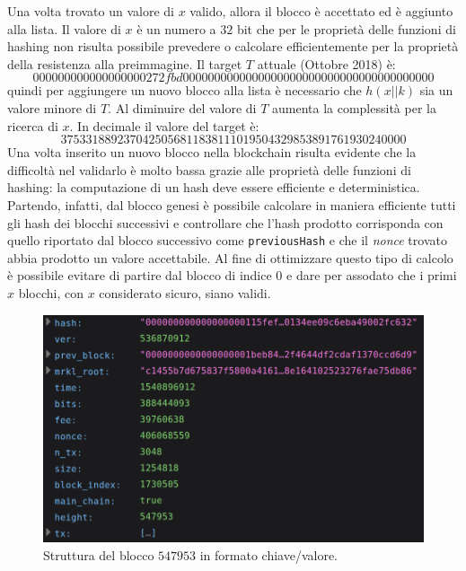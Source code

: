 Una volta trovato un valore di $x$ valido, allora il blocco è accettato ed è aggiunto alla lista. Il valore di $x$ è un numero a $32$ bit che per le proprietà delle funzioni di hashing non risulta possibile prevedere o calcolare efficientemente per la proprietà della resistenza alla preimmagine.\newline
Il target $T$ attuale (Ottobre 2018) è:
\begin{equation}
    000000000000000000272fbd0000000000000000000000000000000000000000
\end{equation}
quindi per aggiungere un nuovo blocco alla lista è necessario che $h(x||k)$ sia un valore minore di $T$. Al diminuire del valore di $T$ aumenta la complessità per la ricerca di $x$.\newline
In decimale il valore del target è:
\begin{equation}
    3753318892370425056811838111019504329853891761930240000
\end{equation}
Una volta inserito un nuovo blocco nella blockchain risulta evidente che la difficoltà nel validarlo è molto bassa grazie alle proprietà delle funzioni di hashing: la computazione di un hash deve essere efficiente e deterministica.\newline
Partendo, infatti, dal blocco genesi è possibile calcolare in maniera efficiente tutti gli hash dei blocchi successivi e controllare che l'hash prodotto corrisponda con quello riportato dal blocco successivo come \texttt{previousHash} e che il \textit{nonce} trovato abbia prodotto un valore accettabile.\newline
Al fine di ottimizzare questo tipo di calcolo è possibile evitare di partire dal blocco di indice $0$ e dare per assodato che i primi $x$ blocchi, con $x$ considerato sicuro, siano validi.
\begin{figure}[H]
    \centering
    \includegraphics[width=\textwidth]{images/block.png}
    \caption{Struttura del blocco $547953$ in formato chiave/valore.}
\end{figure}

